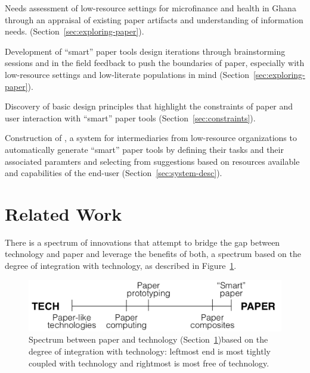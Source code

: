 \documentclass{sig-alternate}
\begin{document}
\begin{compactitem}

  \item Needs assessment of low-resource settings for microfinance and health in Ghana through an appraisal of existing paper artifacts and understanding of information needs. (Section~\ref{sec:exploring-paper}).
  \item Development of ``smart'' paper tools design iterations through brainstorming sessions and in the field feedback to push the boundaries of paper, especially with low-resource settings and low-literate populations in mind (Section~\ref{sec:exploring-paper}).
  \item Discovery of basic design principles that highlight the constraints of paper and user interaction with ``smart'' paper tools (Section~\ref{sec:constraints}).
  \item Construction of \nifty, a system for intermediaries from low-resource organizations to automatically generate ``smart'' paper tools by defining their tasks and their associated paramters and selecting from suggestions based on resources available and capabilities of the end-user (Section~\ref{sec:system-desc}). 

\end{compactitem}


\section{Related Work}
\label{sec:related}

There is a spectrum of innovations that attempt to bridge the gap between technology and paper and leverage the benefits of both, a spectrum based on the degree of integration with technology, as described in Figure~\ref{fig:spectrum}.

\begin{figure}
\centering
\includegraphics[width=\linewidth]{img/spectrum.png}
\caption{Spectrum between paper and technology (Section~\ref{sec:related})based on the degree of integration with technology: leftmost end is most tightly coupled with technology and rightmost is most free of technology.}
\label{fig:spectrum}
\end{figure}
\end{document}
